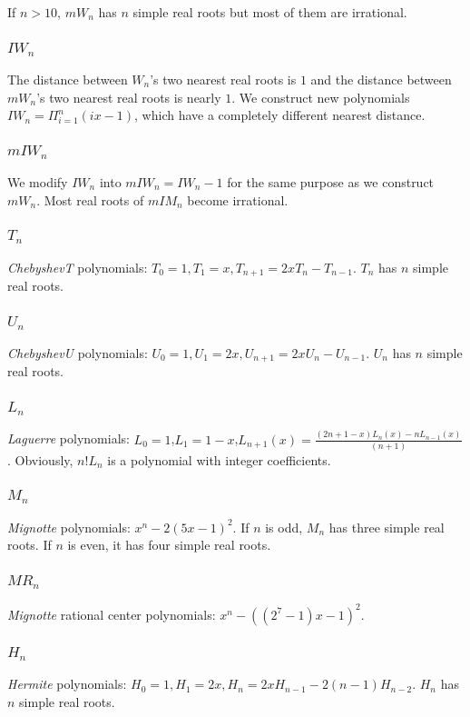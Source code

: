   If $n>10$, $mW_n$ has $n$ simple real roots but most of them are irrational.
 \subsubsection{$IW_n$}
 The distance between  $W_n$'s two  nearest real roots  is  $1$ and the distance between $mW_n$'s two nearest real roots  is nearly $1$. %
 We construct new polynomials $IW_n=\Pi_{i=1}^n(ix-1)$, which have a completely different nearest distance. %
 \subsubsection{$ mIW_n$ }
 We modify $IW_n$  into $mIW_n=IW_n-1$ for the same purpose  as we construct $mW_n$. Most real roots of $mIM_n$  become irrational.
 \subsubsection{$T_n$} {\it ChebyshevT} polynomials: $T_0=1,T_1=x,T_{n+1}=2xT_n-T_{n-1}$. $T_n$ has $n$ simple real roots.
 \subsubsection{$U_n$} {\it ChebyshevU} polynomials: $U_0=1,U_1=2x,U_{n+1}=2xU_n-U_{n-1}$. $U_n$ has $n$ simple real roots.
 \subsubsection{$L_n$}
 {\it Laguerre}  polynomials: $L_0=1$,$L_1=1-x$,$L_{n+1}(x)=\frac{  (2n+1-x )L_n(x)-  nL_{n-1 }(x)}{(n+1) }$. %
Obviously, $n!L_n$ is a polynomial with integer coefficients.
 \subsubsection{$M_n$} {\it Mignotte} polynomials: $x^n-2(5x-1)^2$. If $n$ is odd, $M_n$ has three simple real roots. If $n$ is even, it has four simple real roots.

\subsubsection{$MR_n$}{\it Mignotte} rational center polynomials: $ x^n-((2^7-1)x-1)^2$.
	
 \subsubsection{$H_n$}{\it Hermite } polynomials:  $H_0=1,H_1=2x,H_n=2xH_{n-1}-2(n-1)H_{n-2}$. $H_n$ has $n$ simple real roots.

